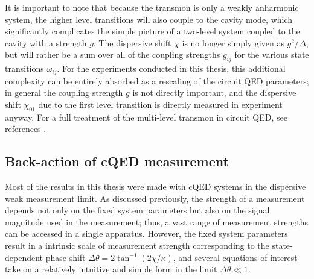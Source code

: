 It is important to note that because the transmon is only a weakly anharmonic system, the higher level transitions will also couple to the cavity mode, which significantly complicates the simple picture of a two-level system coupled to the cavity with a strength $g$.  The dispersive shift $\chi$ is no longer simply given as $g^2/\Delta$, but will rather be a sum over all of the coupling strengths $g_{ij}$ for the various state transitions $\omega_{ij}$.  For the experiments conducted in this thesis, this additional complexity can be entirely absorbed as a rescaling of the circuit QED parameters; in general the coupling strength $g$ is not directly important, and the dispersive shift $\chi_{01}$ due to the first level transition is directly measured in experiment anyway.  For a full treatment of the multi-level transmon in circuit QED, see references \cite{slichterthesis,Weber2014a}.

\subsection{Back-action of cQED measurement}\label{s:cQED_backaction}

Most of the results in this thesis were made with cQED systems in the dispersive weak measurement limit.  As discussed previously, the strength of a measurement depends not only on the fixed system parameters but also on the signal magnitude used in the measurement; thus, a vast range of measurement strengths can be accessed in a single apparatus.  However, the fixed system parameters result in a intrinsic scale of measurement strength corresponding to the state-dependent phase shift $\Delta \theta = 2 \tan^{-1}(2 \chi / \kappa)$, and several equations of interest take on a relatively intuitive and simple form in the limit $\Delta \theta \ll 1$.

